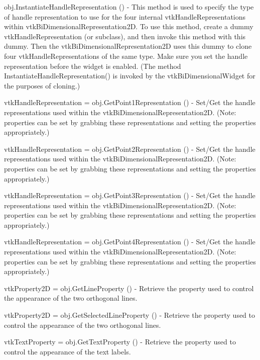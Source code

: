 \begin{DoxyItemize}
\item {\ttfamily obj.\-Instantiate\-Handle\-Representation ()} -\/ This method is used to specify the type of handle representation to use for the four internal vtk\-Handle\-Representations within vtk\-Bi\-Dimensional\-Representation2\-D. To use this method, create a dummy vtk\-Handle\-Representation (or subclass), and then invoke this method with this dummy. Then the vtk\-Bi\-Dimensional\-Representation2\-D uses this dummy to clone four vtk\-Handle\-Representations of the same type. Make sure you set the handle representation before the widget is enabled. (The method Instantiate\-Handle\-Representation() is invoked by the vtk\-Bi\-Dimensional\-Widget for the purposes of cloning.)  
\item {\ttfamily vtk\-Handle\-Representation = obj.\-Get\-Point1\-Representation ()} -\/ Set/\-Get the handle representations used within the vtk\-Bi\-Dimensional\-Representation2\-D. (Note\-: properties can be set by grabbing these representations and setting the properties appropriately.)  
\item {\ttfamily vtk\-Handle\-Representation = obj.\-Get\-Point2\-Representation ()} -\/ Set/\-Get the handle representations used within the vtk\-Bi\-Dimensional\-Representation2\-D. (Note\-: properties can be set by grabbing these representations and setting the properties appropriately.)  
\item {\ttfamily vtk\-Handle\-Representation = obj.\-Get\-Point3\-Representation ()} -\/ Set/\-Get the handle representations used within the vtk\-Bi\-Dimensional\-Representation2\-D. (Note\-: properties can be set by grabbing these representations and setting the properties appropriately.)  
\item {\ttfamily vtk\-Handle\-Representation = obj.\-Get\-Point4\-Representation ()} -\/ Set/\-Get the handle representations used within the vtk\-Bi\-Dimensional\-Representation2\-D. (Note\-: properties can be set by grabbing these representations and setting the properties appropriately.)  
\item {\ttfamily vtk\-Property2\-D = obj.\-Get\-Line\-Property ()} -\/ Retrieve the property used to control the appearance of the two orthogonal lines.  
\item {\ttfamily vtk\-Property2\-D = obj.\-Get\-Selected\-Line\-Property ()} -\/ Retrieve the property used to control the appearance of the two orthogonal lines.  
\item {\ttfamily vtk\-Text\-Property = obj.\-Get\-Text\-Property ()} -\/ Retrieve the property used to control the appearance of the text labels.  

\end{DoxyItemize}
